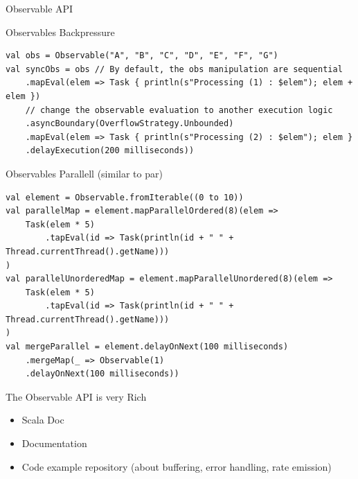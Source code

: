 \documentclass[presentation, 9pt]{beamer}\mode<presentation>{\usetheme{AMSBolognaFC}}
\begin{document}
\begin{frame}{Observable API}
				 \begin{alertblock}{Observables Backpressure}
					\begin{tcolorbox}[left=0pt, top=0pt, bottom=0pt]
								 \begin{verbatim}
val obs = Observable("A", "B", "C", "D", "E", "F", "G")
val syncObs = obs // By default, the obs manipulation are sequential
	.mapEval(elem => Task { println(s"Processing (1) : $elem"); elem + elem })
	// change the observable evaluation to another execution logic
	.asyncBoundary(OverflowStrategy.Unbounded)
	.mapEval(elem => Task { println(s"Processing (2) : $elem"); elem }
	.delayExecution(200 milliseconds))
								 \end{verbatim}
							 \end{tcolorbox}
					 \end{alertblock}	
					 \begin{alertblock}{Observables Parallell (similar to par)}
					\begin{tcolorbox}[left=0pt, top=0pt, bottom=0pt]
						\begin{verbatim}
val element = Observable.fromIterable((0 to 10))
val parallelMap = element.mapParallelOrdered(8)(elem =>
	Task(elem * 5)
		.tapEval(id => Task(println(id + " " + Thread.currentThread().getName)))
)
val parallelUnorderedMap = element.mapParallelUnordered(8)(elem =>
	Task(elem * 5)
		.tapEval(id => Task(println(id + " " + Thread.currentThread().getName)))
)
val mergeParallel = element.delayOnNext(100 milliseconds)
	.mergeMap(_ => Observable(1)
	.delayOnNext(100 milliseconds))
							\end{verbatim}
						\end{tcolorbox}
					\end{alertblock}	
					\begin{alertblock}{The Observable API is very Rich}
						\begin{itemize}
							\item Scala Doc \href{https://monix.io/api/current/monix/reactive/index.htmlhttps://monix.io/api/current/monix/reactive/index.html}{\faLink}
       				\item Documentation  \href{https://monix.io/docs/current/reactive/observable.html}{\faLink}
           \item Code example repository (about buffering, error handling, rate emission)  \href{}{\faLink}
						\end{itemize}
					\end{alertblock}	
\end{frame}
\end{document}
